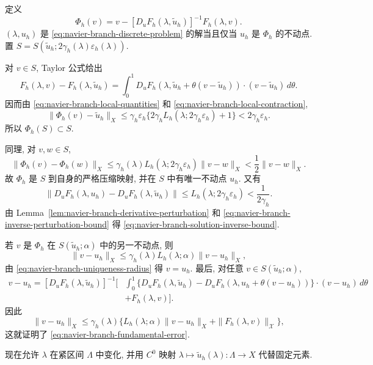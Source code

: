\begin{Proof}
定义
\[
\Phi_h(v)=v-[D_uF_h(\lambda,\widetilde u_h)]^{-1}F_h(\lambda,v).
\]
$(\lambda,u_h)$ 是 \eqref{eq:navier-branch-discrete-problem} 的解当且仅当 $u_h$ 是
$\Phi_h$ 的不动点. 置
$S=S(\widetilde u_h;2\gamma_h(\lambda)\varepsilon_h(\lambda))$.

对 $v\in S$, Taylor 公式给出
\[
F_h(\lambda,v)-F_h(\lambda,\widetilde u_h)
=\int_0^1D_uF_h(\lambda,\widetilde u_h+\theta(v-\widetilde u_h))
\cdot(v-\widetilde u_h)\,d\theta.
\]
因而由 \eqref{eq:navier-branch-local-quantities} 和
\eqref{eq:navier-branch-local-contraction},
\[
\|\Phi_h(v)-\widetilde u_h\|_X
\leq\gamma_h\varepsilon_h
\{2\gamma_hL_h(\lambda;2\gamma_h\varepsilon_h)+1\}
<2\gamma_h\varepsilon_h.
\]
所以 $\Phi_h(S)\subset S$.

同理, 对 $v,w\in S$,
\[
\|\Phi_h(v)-\Phi_h(w)\|_X
\leq\gamma_h(\lambda)L_h(\lambda;2\gamma_h\varepsilon_h)
\|v-w\|_X<\frac12\|v-w\|_X.
\]
故 $\Phi_h$ 是 $S$ 到自身的严格压缩映射, 并在 $S$ 中有唯一不动点 $u_h$.
又有
\[
\|D_uF_h(\lambda,u_h)-D_uF_h(\lambda,\widetilde u_h)\|
\leq L_h(\lambda;2\gamma_h\varepsilon_h)<\frac1{2\gamma_h}.
\]
由 Lemma~\ref{lem:navier-branch-derivative-perturbation} 和
\eqref{eq:navier-branch-inverse-perturbation-bound} 得
\eqref{eq:navier-branch-solution-inverse-bound}.

若 $v$ 是 $\Phi_h$ 在 $S(\widetilde u_h;\alpha)$ 中的另一不动点, 则
\[
\|v-u_h\|_X\leq\gamma_h(\lambda)L_h(\lambda;\alpha)\|v-u_h\|_X,
\]
由 \eqref{eq:navier-branch-uniqueness-radius} 得 $v=u_h$.
最后, 对任意 $v\in S(\widetilde u_h;\alpha)$,
\begin{equation}\label{eq:navier-branch-error-identity}
\begin{aligned}
v-u_h=[D_uF_h(\lambda,\widetilde u_h)]^{-1}
\bigg[&\int_0^1\{D_uF_h(\lambda,\widetilde u_h)
-D_uF_h(\lambda,u_h+\theta(v-u_h))\}\cdot(v-u_h)\,d\theta\\
&+F_h(\lambda,v)\bigg].
\end{aligned}
\end{equation}
因此
\[
\|v-u_h\|_X
\leq\gamma_h(\lambda)
\{L_h(\lambda;\alpha)\|v-u_h\|_X+\|F_h(\lambda,v)\|_{\mathscr X}\},
\]
这就证明了 \eqref{eq:navier-branch-fundamental-error}.
\end{Proof}

现在允许 $\lambda$ 在紧区间 $\Lambda$ 中变化, 并用 $C^0$ 映射
$\lambda\mapsto\widetilde u_h(\lambda):\Lambda\to X$ 代替固定元素.

